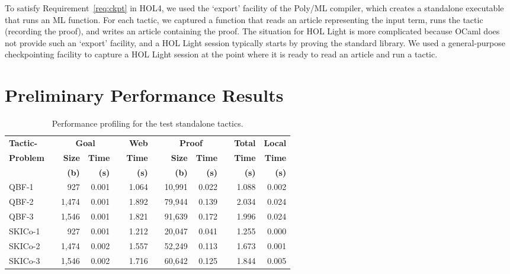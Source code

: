 \documentclass{llncs}
\begin{document}
To satisfy Requirement~\ref{req:ckpt} in HOL4, we used the `export' facility of the Poly/ML compiler, which creates a standalone executable that runs an ML function.
For each tactic, we captured a function that reads an article representing the input term, runs the tactic (recording the proof), and writes an article containing the proof.
The situation for HOL Light is more complicated because OCaml does not provide such an `export' facility, and a HOL Light session typically starts by proving the standard library.
We used a general-purpose checkpointing facility to capture a HOL Light session at the point where it is ready to read an article and run a tactic.


\section{Preliminary Performance Results}
\label{sec:performance}

\begin{table}
\begin{center}
\begin{tabular}{||@{~}l@{~}||@{}l@{~}r@{~}|@{~}r@{~}l@{}||@{~}r@{~}||@{}l@{~}r@{~}|@{~}r@{~}l@{}||@{~}r@{~}||r@{~}||}
\hline
\textbf{Tactic-} & & \multicolumn{2}{c}{\textbf{Goal}} & & \textbf{Web} & & \multicolumn{2}{c}{\textbf{Proof}} & & \textbf{Total} & \textbf{Local} \\
\cline{2-4} \cline{7-9}
\textbf{Problem} & & \textbf{Size} & \textbf{Time} & & \textbf{Time} & & \textbf{Size} & \textbf{Time} & & \textbf{Time} & \textbf{Time} \\
 & & \textbf{(b)} & \textbf{(s)} & & \textbf{(s)} & & \textbf{(b)} & \textbf{(s)} & & \textbf{(s)} & \textbf{(s)} \\
\hline
QBF-1 & & 927 & 0.001 & & 1.064 & & 10,991 & 0.022 & & 1.088 & 0.002\\
QBF-2 & & 1,474 & 0.001 & & 1.892 & & 79,944 & 0.139 & & 2.034 & 0.024\\
QBF-3 & & 1,546 & 0.001 & & 1.821 & & 91,639 & 0.172 & & 1.996 & 0.024\\
SKICo-1 & & 927 & 0.001 & & 1.212 & & 20,047 & 0.041 & & 1.255 & 0.000\\
SKICo-2 & & 1,474 & 0.002 & & 1.557 & & 52,249 & 0.113 & & 1.673 & 0.001\\
SKICo-3 & & 1,546 & 0.002 & & 1.716 & & 60,642 & 0.125 & & 1.844 & 0.005\\
\hline
\end{tabular}
\end{center}
\caption{Performance profiling for the test standalone tactics.}
\label{tab:performance}
\end{table}
\end{document}
